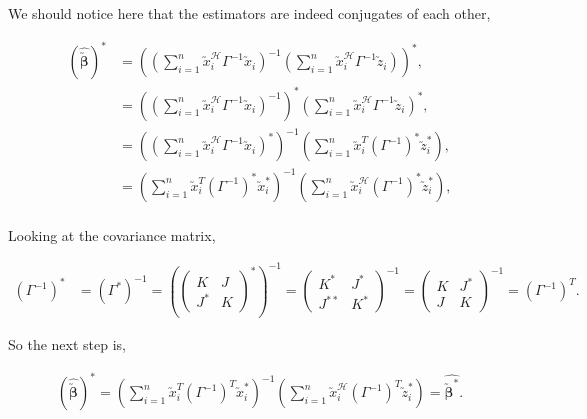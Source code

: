 \documentclass[honours,12pt]{unswthesis}
\newcommand{\augb}{\bm{\utilde{\beta}}}
\newcommand{\ct}{\mathcal{H}}
\numberwithin{equation}{section}
\begin{document}
\noindent We should notice here that the estimators are indeed conjugates of each other,

\begin{align*}
	\left( \widehat{\augb} \right)^{*} &= \left( \left( \sum_{i=1}^{n} \utilde{x}_{i}^{\ct} \Gamma^{-1} \utilde{x}_{i} \right)^{-1} \left( \sum_{i=1}^{n} \utilde{x}_{i}^{\ct} \Gamma^{-1} \utilde{z}_{i} \right) \right)^{*},\\
	&= \left( \left( \sum_{i=1}^{n} \utilde{x}_{i}^{\ct} \Gamma^{-1} \utilde{x}_{i} \right)^{-1} \right)^{*} \left( \sum_{i=1}^{n} \utilde{x}_{i}^{\ct} \Gamma^{-1} \utilde{z}_{i} \right)^{*},\\
	&= \left( \left( \sum_{i=1}^{n} \utilde{x}_{i}^{\ct} \Gamma^{-1} \utilde{x}_{i} \right)^{*} \right)^{-1} \left( \sum_{i=1}^{n} \utilde{x}_{i}^{T} \left( \Gamma^{-1} \right)^{*} \utilde{z}_{i}^{*} \right),\\
	&= \left( \sum_{i=1}^{n} \utilde{x}_{i}^{T} \left( \Gamma^{-1} \right) ^{*} \utilde{x}_{i}^{*} \right)^{-1} \left( \sum_{i=1}^{n} \utilde{x}_{i}^{\ct} \left( \Gamma^{-1} \right)^{*} \utilde{z}_{i}^{*} \right),\\
\end{align*}

\noindent Looking at the covariance matrix,

\begin{align*}
	\left( \Gamma^{-1} \right)^{*} &= \left( \Gamma^{*} \right)^{-1}
	= \left( 
		\begin{pmatrix}
			K & J \\
			J^{*} & K
		\end{pmatrix}^{*}
	\right)^{-1}
	= \begin{pmatrix}
		K^{*} & J^{*} \\
		J^{**} &  K^{*}
	\end{pmatrix}^{-1}
	= \begin{pmatrix}
		K & J^{*} \\
		J & K
	\end{pmatrix}^{-1}
	= \left( \Gamma^{-1} \right)^{T}.
\end{align*}

\noindent So the next step is,

\begin{align*}
	\left( \widehat{\augb} \right)^{*} = \left( \sum_{i=1}^{n} \utilde{x}_{i}^{T} \left( \Gamma^{-1} \right)^{T} \utilde{x}_{i}^{*} \right)^{-1} \left( \sum_{i=1}^{n} \utilde{x}_{i}^{\ct} \left( \Gamma^{-1} \right)^{T} \utilde{z}_{i}^{*} \right) = \widehat{\augb^{*}}.
\end{align*}
\end{document}
